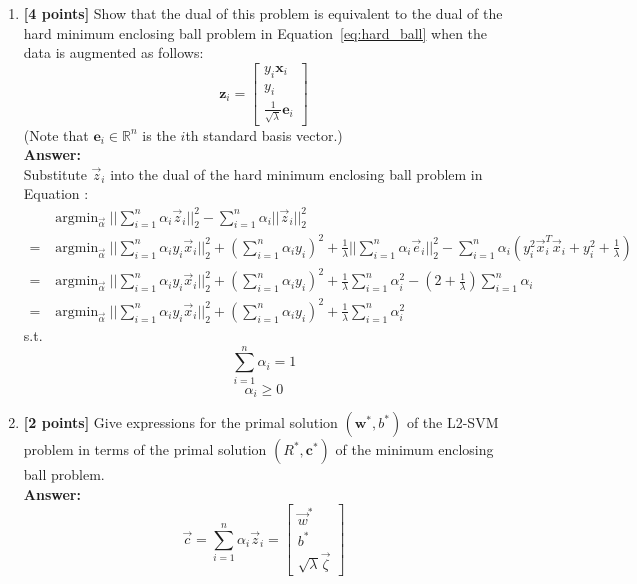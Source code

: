 \documentclass{article}
\DeclareMathOperator*{\argmin}{\mathrm{argmin}}
\begin{document}
\begin{enumerate}[resume]
	\item \textbf{[4 points]} Show that the dual of this problem is equivalent to the dual of the hard minimum enclosing ball problem in Equation~\ref{eq:hard_ball} when the data is augmented as follows:
	\[\boldsymbol{z}_{i}=\left[\begin{array}{c}
	y_{i}\boldsymbol{x}_{i}\\
	y_{i}\\
	\frac{1}{\sqrt{\lambda}}\boldsymbol{e}_{i}
	\end{array}\right]\]
	(Note that $\boldsymbol{e}_i\in\mathbb{R}^n$ is the $i$th standard basis vector.)\\
	\textbf{Answer:}\\
	Substitute $\vec{z}_i$ into the dual of the hard minimum enclosing ball problem in Equation \label{eq:hard_ball}:
	\begin{equation}
	\nonumber
	\begin{array}{rl}
	& \argmin_{\vec{\alpha}} ||\sum_{i=1}^n\alpha_i\vec{z}_i||_2^2 - \sum_{i=1}^n \alpha_i||\vec{z}_i||_2^2  \\
	= & \argmin_{\vec{\alpha}} ||\sum_{i=1}^n\alpha_iy_i\vec{x}_i||_2^2 + (\sum_{i=1}^n\alpha_iy_i)^2 + \frac{1}{\lambda}||\sum_{i=1}^n\alpha_i\vec{e}_i||_2^2 - \sum_{i=1}^n \alpha_i(y_i^2\vec{x}_i^T\vec{x}_i+y_i^2+\frac{1}{\lambda}) \\
	= & \argmin_{\vec{\alpha}} ||\sum_{i=1}^n\alpha_iy_i\vec{x}_i||_2^2 + (\sum_{i=1}^n\alpha_iy_i)^2 + \frac{1}{\lambda}\sum_{i=1}^{n}\alpha_i^2 - (2+\frac{1}{\lambda})\sum_{i=1}^n \alpha_i \\
	= & \argmin_{\vec{\alpha}} ||\sum_{i=1}^n\alpha_iy_i\vec{x}_i||_2^2 + (\sum_{i=1}^n\alpha_iy_i)^2 + \frac{1}{\lambda}\sum_{i=1}^{n}\alpha_i^2
	\end{array}
	\end{equation}
	s.t.
	$$\sum_{i=1}^{n}\alpha_i=1$$
	$$\alpha_i \geq 0$$


	\item \textbf{[2 points]} Give expressions for the primal solution $\left( \boldsymbol{w}^{*}, b^{*} \right)$ of the L2-SVM problem in terms of the primal solution $\left( R^{*}, \boldsymbol{c}^{*} \right)$ of the minimum enclosing ball problem.\\
	\textbf{Answer:}\\
	\begin{equation}
	\nonumber
	\vec{c}=\sum_{i=1}^{n}\alpha_i \vec{z}_i=\left[
	\begin{array}{c}
	\vec{w}^* \\
	b^* \\
	\sqrt{\lambda}\vec{\zeta}
	\end{array}\right]
	\end{equation}
		
\end{enumerate}
\end{document}
